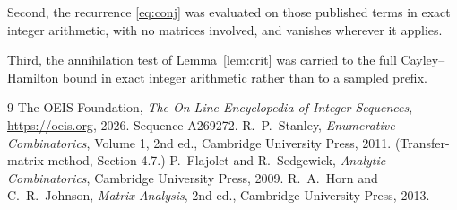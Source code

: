 \documentclass[11pt,a4paper]{article}
\theoremstyle{plain}
\theoremstyle{definition}
\begin{document}
Second, the recurrence \eqref{eq:conj} was evaluated on those published terms in exact
integer arithmetic, with no matrices involved, and vanishes wherever it applies.

Third, the annihilation test of Lemma~\ref{lem:crit} was carried to the full
Cayley--Hamilton bound in exact integer arithmetic rather than to a sampled prefix.

\begin{thebibliography}{9}
 The OEIS Foundation, \emph{The On-Line Encyclopedia of Integer
Sequences}, \url{https://oeis.org}, 2026. Sequence A269272.
 R.~P.~Stanley, \emph{Enumerative Combinatorics}, Volume 1, 2nd ed.,
Cambridge University Press, 2011. (Transfer-matrix method, Section 4.7.)
 P.~Flajolet and R.~Sedgewick, \emph{Analytic Combinatorics}, Cambridge
University Press, 2009.
 R.~A.~Horn and C.~R.~Johnson, \emph{Matrix Analysis}, 2nd ed., Cambridge
University Press, 2013.
\end{thebibliography}
\end{document}
